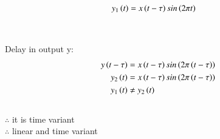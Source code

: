 \documentclass[journal,12pt,twocolumn]{IEEEtran}
\theoremstyle{remark}
\begin{document}
\begin{align}
y_1\left(t\right)&=x\left(t-\tau\right)sin\left(2\pi t\right)
\end{align}
\\\\Delay in output y:
\begin{align}
y\left(t-\tau\right)&=x\left(t-\tau\right)sin\left(2\pi\left(t-\tau\right)\right)
\\y_2\left(t\right)&=x\left(t-\tau\right)sin\left(2\pi\left(t-\tau\right)\right)
\\y_1\left(t\right)&\neq y_2\left(t\right)
\end{align}
\\$\therefore$ it is time variant
\\$\therefore$  linear and time variant 
\end{document}
